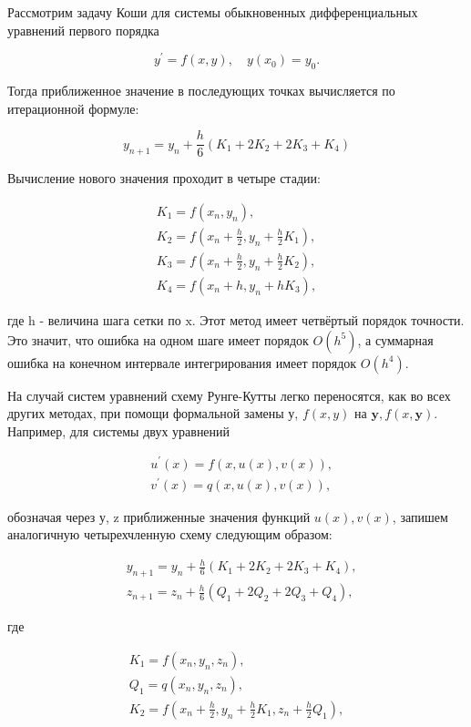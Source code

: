 \documentclass[a4paper,12pt]{article}
\begin{document}
Рассмотрим задачу Коши для системы обыкновенных дифференциальных уравнений первого порядка

$$
y^{\prime}=f(x, y), \quad y\left(x_{0}\right)=y_{0} .
$$

Тогда приближенное значение в последующих точках вычисляется по итерационной формуле:

$$
y_{n+1}=y_{n}+\frac{h}{6}\left(K_{1}+2 K_{2}+2 K_{3}+K_{4}\right)
$$

Вычисление нового значения проходит в четыре стадии:

$$
\begin{gathered}
	K_{1}=f\left(x_{n}, y_{n}\right), \\
	K_{2}=f\left(x_{n}+\frac{h}{2}, y_{n}+\frac{h}{2} K_{1}\right), \\
	K_{3}=f\left(x_{n}+\frac{h}{2}, y_{n}+\frac{h}{2} K_{2}\right), \\
	K_{4}=f\left(x_{n}+h, y_{n}+h K_{3}\right),
\end{gathered}
$$

где $\mathrm{h}$ - величина шага сетки по $\mathrm{x}$. Этот метод имеет четвёртый порядок точности. Это значит, что ошибка на одном шаге имеет порядок $O\left(h^{5}\right)$, а суммарная ошибка на конечном интервале интегрирования имеет порядок $O\left(h^{4}\right)$.

На случай систем уравнений схему Рунге-Кутты легко переносятся, как во всех других методах, при помощи формальной замены у, $f(x, y)$ на $\boldsymbol{y}, f(x, \boldsymbol{y})$. Например, для системы двух уравнений

$$
\begin{aligned}
	&u^{\prime}(x)=f(x, u(x), v(x)), \\
	&v^{\prime}(x)=q(x, u(x), v(x)),
\end{aligned}
$$

обозначая через у, $\mathrm{z}$ приближенные значения функций $u(x), v(x)$, запишем аналогичную четырехчленную схему следующим образом:

$$
\begin{aligned}
	&y_{n+1}=y_{n}+\frac{h}{6}\left(K_{1}+2 K_{2}+2 K_{3}+K_{4}\right), \\
	&z_{n+1}=z_{n}+\frac{h}{6}\left(Q_{1}+2 Q_{2}+2 Q_{3}+Q_{4}\right),
\end{aligned}
$$

где

$$
\begin{gathered}
	K_{1}=f\left(x_{n}, y_{n}, z_{n}\right), \\
	Q_{1}=q\left(x_{n}, y_{n}, z_{n}\right), \\
	K_{2}=f\left(x_{n}+\frac{h}{2}, y_{n}+\frac{h}{2} K_{1}, z_{n}+\frac{h}{2} Q_{1}\right),
\end{gathered}
$$
\end{document}
